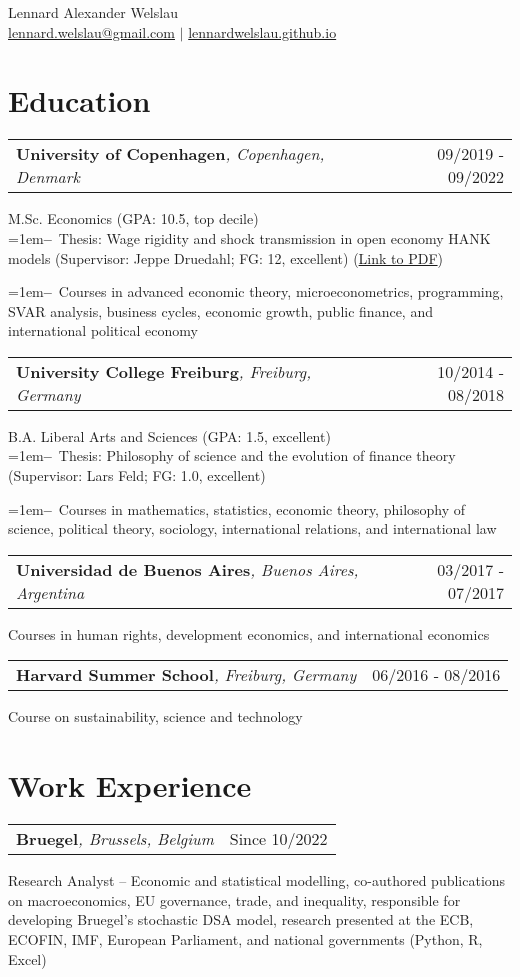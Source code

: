\documentclass[A4,11pt]{article}
\makeatletter
\newcommand{\Subheading}[4]{   
    \begin{tabular*}{0.97\textwidth}[t]{l@{\extracolsep{\fill}}r}
      \textbf{#1}\textit{\small #2} & \small #3 
      \end{tabular*}
      \small #4 
    \vspace{7pt}}
\newcommand{\myitem}[1]{\hangindent=1em\hangafter=1\textbf{--}~#1\par}
\makeatother
\begin{document}
\begin{center}
    {\Large Lennard Alexander Welslau} \\ 
    \href{mailto:lennard.welslau@gmail.com}{lennard.welslau@gmail.com} $|$ \href{https://lennardwelslau.github.io/}{lennardwelslau.github.io}
\end{center}


\section{Education}

    \Subheading
        {University of Copenhagen}{, Copenhagen, Denmark}{09/2019 - 09/2022}
        {M.Sc. Economics (GPA: 10.5, top decile) \\
        \myitem{Thesis: Wage rigidity and shock transmission in open economy HANK models (Supervisor: Jeppe Druedahl; FG: 12, excellent) (\href{https://lennardwelslau.github.io/research/Welslau_MA_Thesis_2022_Wage_Flexibility_Open_Economy_HANK.pdf}{Link to PDF})}
        \myitem{Courses in advanced economic theory, microeconometrics, programming, SVAR analysis, business cycles, economic growth, public finance, and international political economy}
        } 

    \Subheading
        {University College Freiburg}{, Freiburg, Germany}{10/2014 - 08/2018}
        {B.A. Liberal Arts and Sciences (GPA: 1.5, excellent) \\
        \myitem{Thesis: Philosophy of science and the evolution of finance theory (Supervisor: Lars Feld; FG: 1.0, excellent)}
        \myitem{Courses in mathematics, statistics, economic theory, philosophy of science, political theory, sociology, international relations, and international law}
        }

    \Subheading
        {Universidad de Buenos Aires}{, Buenos Aires, Argentina}{03/2017 - 07/2017}
        {Courses in human rights, development economics, and international economics}
    
    \Subheading
        {Harvard Summer School}{, Freiburg, Germany}{06/2016 - 08/2016}
        {Course on sustainability, science and technology}

\section{Work Experience}

    \Subheading
        {Bruegel}{, Brussels, Belgium}{Since 10/2022}
        {Research Analyst -- Economic and statistical modelling, 
        co-authored publications on macroeconomics, EU governance, trade, and inequality,
        responsible for developing Bruegel's stochastic DSA model,
        research presented at the ECB, ECOFIN, IMF, European Parliament, and national governments (Python, R, Excel)}{}
\end{document}
